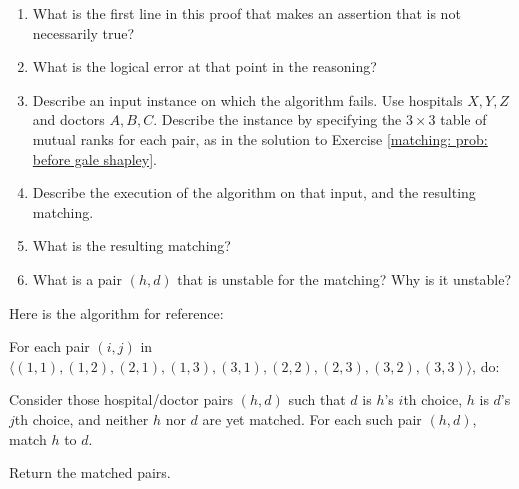 \documentclass[11pt]{article}
\begin{document}
\begin{enumerate}[label=(\alph*)]

\item
  What is the first line in this proof that makes an assertion that is not necessarily true?

\item
  What is the logical error at that point in the reasoning?

\item
  Describe an input instance on which the algorithm fails.
  Use hospitals $X, Y, Z$ and doctors $A, B, C$.
  Describe the instance by specifying the $3\times 3$ table of mutual ranks for each pair,
  as in the solution to Exercise \ref{matching: prob: before gale shapley}.

\item
  Describe the execution of the algorithm on that input, and the resulting matching.

\item
  What is the resulting matching?

\item
  What is a pair $(h, d)$ that is unstable for the matching?  Why is it unstable?
  
\end{enumerate}

\continued

Here is the algorithm for reference:

\begin{myframed}

  \begin{steps}
    \step For each pair $(i,j)$ in $\langle (1,1), (1,2), (2,1), (1,3), (3,1), (2,2), (2,3), (3,2), (3,3) \rangle$, do:

    \begin{steps}
      \step Consider those hospital/doctor pairs $(h, d)$ such that $d$ is $h$'s $i$th choice,
      $h$ is $d$'s $j$th choice, and neither $h$ nor $d$ are yet matched.
      For each such pair $(h, d)$, match $h$ to $d$.
    \end{steps}

    \step Return the matched pairs.
  \end{steps}

\end{myframed}




\end{document}
